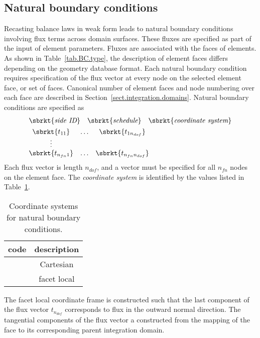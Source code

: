 \subsection{Natural boundary conditions}
\label{set.ICandBC.traction}
Recasting balance laws in weak form leads to natural boundary 
conditions involving flux terms across domain surfaces. These fluxes
are specified as part of the input of element parameters. Fluxes are 
associated with the faces of elements. As shown in Table~\ref{tab.BC.type}, 
the description of element faces differs depending on the geometry 
database format. Each natural boundary condition requires specification
of the flux vector at every node on the selected element face, or set 
of faces. Canonical number of element faces and node numbering over 
each face are described in Section~\ref{sect.integration.domains}.
Natural boundary conditions are specified as
\begin{align}
& \sbrkt{\textit{side ID}} \quad 
\sbrkt{\textit{schedule}} \quad 
\sbrkt{\textit{coordinate system}} \notag \\
& \begin{matrix}
\sbrkt{t_{11}} & \ldots & \sbrkt{t_{1n_{dof}}} \\
\vdots \\
\sbrkt{t_{n_{fn}1}} & \ldots & \sbrkt{t_{n_{fn}n_{dof}}}
\end{matrix} \notag
\end{align}
Each flux vector is length $n_{dof}$, and a vector must be specified 
for all $n_{fn}$ nodes on the element face.
The \textit{coordinate system} is identified by the values listed in 
Table~\ref{tab.BC.coord.sys}.
\begin{table}[h]
\begin{center}
\caption{\label{tab.BC.coord.sys} Coordinate systems for natural 
boundary conditions.}
\begin{tabular}[c]{|c|c|}
\hline
 \parbox[b]{0.75in}{\centering \textbf{code}}
&\parbox[b]{1.5in}{\centering \textbf{description}} \\
\hline
 \parbox[b]{0.75in}{}
&\parbox[b]{1.5in}{\centering Cartesian} \\
\hline
 \parbox[b]{0.75in}{}
&\parbox[b]{1.5in}{\centering facet local} \\
\hline
\end{tabular}
\end{center}
\end{table}
The facet local coordinate frame is constructed such that the last 
component of the flux vector $t_{n_{dof}}$ corresponds to flux in the 
outward normal direction. The tangential components of the flux vector a 
constructed from the mapping of the face to its corresponding parent 
integration domain.

